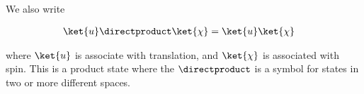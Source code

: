 We also write

\begin{equation}\label{eqn:PHY356Foct26:200}
\begin{aligned}
\ket{u} \directproduct \ket{\chi}  &= \ket{u} \ket{\chi}
\end{aligned}
\end{equation}

where \(\ket{u}\) is associate with translation, and \(\ket{\chi}\) is associated with spin.  This is a product state where the \(\directproduct\) is a symbol for states in two or more different spaces.
